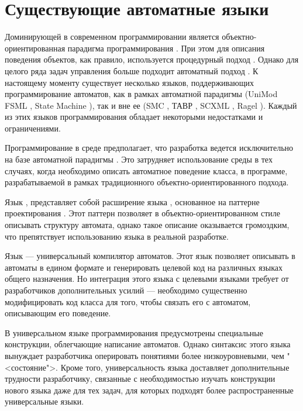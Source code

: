 \section{Существующие автоматные языки}
Доминирующей в современном программировании является объектно-ориентированная парадигма программирования \cite{meyer}. При
этом для описания поведения объектов, как правило, используется процедурный подход \cite{nepeyvoda}. Однако для целого ряда
задач управления больше подходит автоматный подход \cite{polikarpova}. %
К настоящему моменту существует несколько
языков, поддерживающих программирование автоматов, как в рамках автоматной парадигмы (UniMod FSML \cite{lagunov}, State
Machine \cite{shamgunov}), так и вне ее (SMC \cite{smc}, ТАВР \cite{tsimbaluk}, SCXML \cite{scxml}, Ragel \cite{ragel}).
Каждый из этих языков программирования обладает некоторыми недостатками и ограничениями.

Программирование в среде  предполагает, что разработка ведется исключительно на базе автоматной парадигмы
\cite{myUMLSwitchEclipse}. Это затрудняет использование среды  в тех случаях, когда необходимо описать автоматное
поведение класса, в программе, разрабатываемой в рамках традиционного объектно-ориентированного подхода.

Язык , представляет собой расширение языка , основанное на паттерне проектирования 
 \cite{gof}. Этот паттерн позволяет в объектно-ориентированном стиле описывать структуру автомата, однако
такое описание оказывается громоздким, что препятствует использованию языка  в реальной разработке.

Язык  --- универсальный компилятор автоматов. Этот язык позволяет описывать в автоматы в едином формате и
генерировать целевой код на различных языках общего назначения. Но интеграция этого языка с целевыми языками требует от
разработчиков дополнительных усилий --- необходимо существенно модифицировать код класса для того, чтобы связать его с
автоматом, описывающим его поведение.

В универсальном языке программирования  предусмотрены специальные конструкции, облегчающие написание автоматов.
Однако синтаксис этого языка вынуждает разработчика оперировать понятиями более низкоуровневыми, чем "<состояние">. Кроме
того, универсальность языка  доставляет дополнительные трудности разработчику, связанные с необходимостью изучать
конструкции нового языка даже для тех задач, для которых подходят более распространенные универсальные языки.

